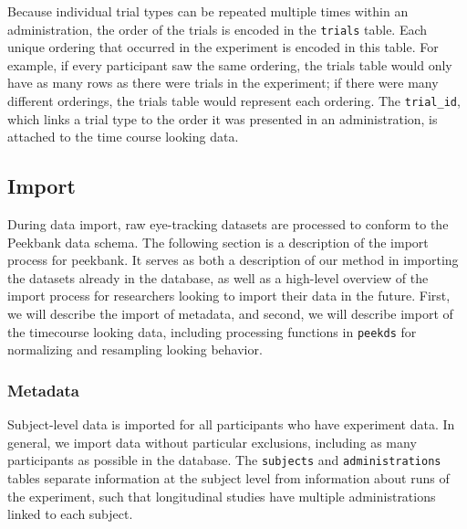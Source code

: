 \documentclass[
  english,
  man,floatsintext]{apa6}
\begin{document}
Because individual trial types can be repeated multiple times within an administration, the order of the trials is encoded in the \texttt{trials} table.
Each unique ordering that occurred in the experiment is encoded in this table.
For example, if every participant saw the same ordering, the trials table would only have as many rows as there were trials in the experiment; if there were many different orderings, the trials table would represent each ordering.
The \texttt{trial\_id}, which links a trial type to the order it was presented in an administration, is attached to the time course looking data.

\hypertarget{import}{%
\subsection{Import}\label{import}}

During data import, raw eye-tracking datasets are processed to conform to the Peekbank data schema.
The following section is a description of the import process for peekbank.
It serves as both a description of our method in importing the datasets already in the database, as well as a high-level overview of the import process for researchers looking to import their data in the future.
First, we will describe the import of metadata, and second, we will describe import of the timecourse looking data, including processing functions in \texttt{peekds} for normalizing and resampling looking behavior.

\hypertarget{metadata-1}{%
\subsubsection{Metadata}\label{metadata-1}}

Subject-level data is imported for all participants who have experiment data.
In general, we import data without particular exclusions, including as many participants as possible in the database.
The \texttt{subjects} and \texttt{administrations} tables separate information at the subject level from information about runs of the experiment, such that longitudinal studies have multiple administrations linked to each subject.
\end{document}
